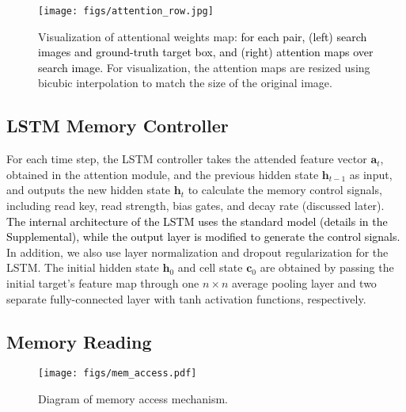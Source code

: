 \documentclass[runningheads]{llncs}
\newcommand{\abcn}[1]{\textcolor{black}{#1}}
\begin{document}
\begin{figure}[t]
	\begin{center}
		\texttt{[image: figs/attention\_row.jpg]}
	\end{center}
	\caption{Visualization of attentional weights map: \abcn{for each pair, (left) search images and ground-truth target box, and (right) attention maps over search image.}
		For visualization, the attention maps are resized using bicubic interpolation to match the size of the original image.}
	\label{fig:3}
\end{figure}

\subsection{LSTM Memory Controller}

For each time step, the LSTM controller takes the attended feature vector $\mathbf{a}_t$, obtained in the attention module, and the previous hidden state $\mathbf{h}_{t-1}$ as input, and outputs the new hidden state $\mathbf{h}_t$ to calculate the memory control signals, including read key, read strength, bias gates, and decay rate (discussed later).
\abcn{The internal architecture of the LSTM uses the standard model (details in the Supplemental), while the output layer is modified to generate the control signals.}
In addition, we also use layer normalization \cite{Ba2016} and dropout regularization \cite{Srivastava2014} for the LSTM. The initial hidden state $\mathbf{h}_0$ and cell state $\mathbf{c}_0$  %
are  
obtained by passing the initial target's feature map through one $n\times n$ average pooling layer and two separate fully-connected layer with tanh activation functions, respectively.


\subsection{Memory Reading}
\begin{figure}[t]
	\begin{center}
		\texttt{[image: figs/mem\_access.pdf]}
	\end{center}
	\caption{Diagram of memory access mechanism.}
	\label{fig:4}
\end{figure}
\end{document}
